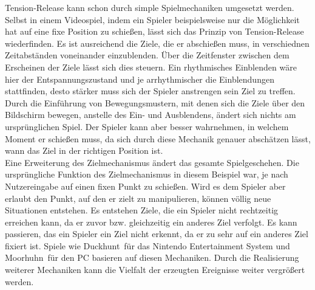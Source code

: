Tension-Release kann schon durch simple Spielmechaniken umgesetzt werden. Selbst in einem Videospiel, indem ein Spieler beispielsweise nur die Möglichkeit hat auf eine fixe Position zu schießen, lässt sich das Prinzip von Tension-Release wiederfinden. Es ist ausreichend die Ziele, die er abschießen muss, in verschiednen Zeitabständen voneinander einzublenden. Über die Zeitfenster zwischen dem Erscheinen der Ziele lässt sich dies steuern. Ein rhythmisches Einblenden wäre hier der Entspannungszustand und je arrhythmischer die Einblendungen stattfinden, desto stärker muss sich der Spieler anstrengen sein Ziel zu treffen. Durch die Einführung von Bewegungsmustern, mit denen sich die Ziele über den Bildschirm bewegen, anstelle des Ein- und Ausblendens, ändert sich nichts am ursprünglichen Spiel. Der Spieler kann aber besser wahrnehmen, in welchem Moment er schießen muss, da sich durch diese Mechanik genauer abschätzen lässt, wann das Ziel in der richtigen Position ist. \\
Eine Erweiterung des Zielmechanismus ändert das gesamte Spielgeschehen. Die ursprüngliche Funktion des Zielmechanismus in diesem Beispiel war, je nach Nutzereingabe auf einen fixen Punkt zu schießen. Wird es dem Spieler aber erlaubt den Punkt, auf den er zielt zu manipulieren, können völlig neue Situationen entstehen. Es entstehen Ziele, die ein Spieler nicht rechtzeitig erreichen kann, da er zuvor bzw. gleichzeitig ein anderes Ziel verfolgt. Es kann passieren, das ein Spieler ein Ziel nicht erkennt, da er zu sehr auf ein anderes Ziel fixiert ist. Spiele wie \glqq Duckhunt\grqq\ für das Nintendo Entertainment System und \glqq Moorhuhn\grqq\ für den PC basieren auf diesen Mechaniken. Durch die Realisierung weiterer Mechaniken kann die Vielfalt der erzeugten Ereignisse weiter vergrößert werden. \\
